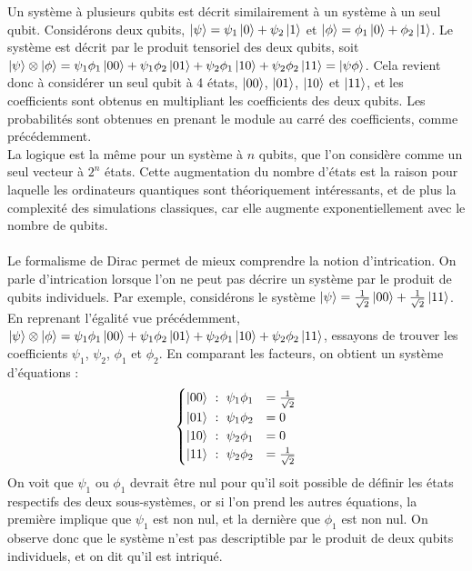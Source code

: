 Un système à plusieurs qubits est décrit similairement à un système à un seul
qubit.
Considérons deux qubits, $\ket{\psi} = \psi_1 \ket{0} + \psi_2 \ket{1}$ et
$\ket{\phi} = \phi_1 \ket{0} + \phi_2 \ket{1}$.
Le système est décrit par le produit tensoriel des deux qubits, soit
$\ket{\psi} \otimes \ket{\phi} = \psi_1 \phi_1 \ket{00} + \psi_1 \phi_2 \ket{01}
+ \psi_2 \phi_1 \ket{10} + \psi_2 \phi_2 \ket{11} = \ket{\psi \phi}$.
Cela revient donc à considérer un seul qubit à 4 états, $\ket{00}$, $\ket{01}$,
$\ket{10}$ et $\ket{11}$, et les coefficients sont obtenus en multipliant les
coefficients des deux qubits.
Les probabilités sont obtenues en prenant le module au carré des coefficients, comme
précédemment.\\
La logique est la même pour un système à $n$ qubits, que l'on considère comme un seul
vecteur à $2^n$ états.
Cette augmentation du nombre d'états est la raison pour laquelle les ordinateurs
quantiques sont théoriquement intéressants, et de plus la complexité des simulations
classiques, car elle augmente exponentiellement avec le nombre de qubits.\\ \\
Le formalisme de Dirac permet de mieux comprendre la notion d'intrication.
On parle d'intrication lorsque l'on ne peut pas décrire un système par le produit
de qubits individuels.
Par exemple, considérons le système $\ket{\psi} = \frac{1}{\sqrt{2}} \ket{00} +
\frac{1}{\sqrt{2}} \ket{11}$.
En reprenant l'égalité vue précédemment, $\ket{\psi} \otimes \ket{\phi} = \psi_1 \phi_1 \ket{00} + \psi_1 \phi_2 \ket{01}
+ \psi_2 \phi_1 \ket{10} + \psi_2 \phi_2 \ket{11}$, essayons de trouver les coefficients
$\psi_1$, $\psi_2$, $\phi_1$ et $\phi_2$.
En comparant les facteurs, on obtient un système d'équations :
\[\begin{cases}
  \ket{00} \ : \ \psi_1 \phi_1 &= \frac{1}{\sqrt{2}} \\
  \ket{01} \ : \ \psi_1 \phi_2 &= 0 \\
  \ket{10} \ : \ \psi_2 \phi_1 &= 0 \\
  \ket{11} \ : \ \psi_2 \phi_2 &= \frac{1}{\sqrt{2}}
\end{cases}\]
On voit que $\psi_1$ ou $\phi_1$ devrait être nul pour qu’il soit possible de définir les
états respectifs des deux sous-systèmes, or si l'on prend les autres équations, la
première implique que $\psi_1$ est non nul, et la dernière que $\phi_1$ est non nul.
On observe donc que le système n'est pas descriptible par le produit de deux qubits
individuels, et on dit qu'il est intriqué.\\ \\
